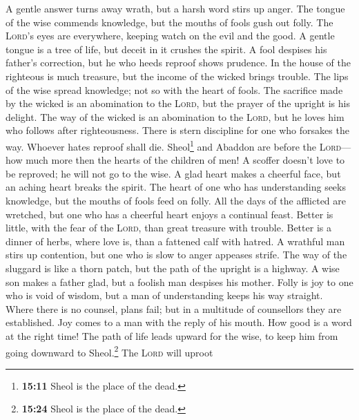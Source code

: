  A gentle answer turns away wrath, but a harsh word stirs
up anger.  The tongue of the wise commends knowledge, but
the mouths of fools gush out folly.  The \textsc{Lord}'s
eyes are everywhere, keeping watch on the evil and the good.
 A gentle tongue is a tree of life, but deceit in it
crushes the spirit.  A fool despises his father's
correction, but he who heeds reproof shows prudence.  In
the house of the righteous is much treasure, but the income of the
wicked brings trouble.  The lips of the wise spread
knowledge; not so with the heart of fools.  The sacrifice
made by the wicked is an abomination to the \textsc{Lord}, but the
prayer of the upright is his delight.  The way of the
wicked is an abomination to the \textsc{Lord}, but he loves him who
follows after righteousness.  There is stern discipline
for one who forsakes the way. Whoever hates reproof shall die.
 Sheol\footnote{\textbf{15:11} Sheol is the place of the
  dead.} and Abaddon are before the \textsc{Lord}--- how much more then
the hearts of the children of men!  A scoffer doesn't
love to be reproved; he will not go to the wise.  A glad
heart makes a cheerful face, but an aching heart breaks the spirit.
 The heart of one who has understanding seeks knowledge,
but the mouths of fools feed on folly.  All the days of
the afflicted are wretched, but one who has a cheerful heart enjoys a
continual feast.  Better is little, with the fear of the
\textsc{Lord}, than great treasure with trouble.  Better
is a dinner of herbs, where love is, than a fattened calf with hatred.
 A wrathful man stirs up contention, but one who is slow
to anger appeases strife.  The way of the sluggard is
like a thorn patch, but the path of the upright is a highway.
 A wise son makes a father glad, but a foolish man
despises his mother.  Folly is joy to one who is void of
wisdom, but a man of understanding keeps his way straight.
 Where there is no counsel, plans fail; but in a
multitude of counsellors they are established.  Joy comes
to a man with the reply of his mouth. How good is a word at the right
time!  The path of life leads upward for the wise, to
keep him from going downward to Sheol.\footnote{\textbf{15:24} Sheol is
  the place of the dead.}  The \textsc{Lord} will uproot
